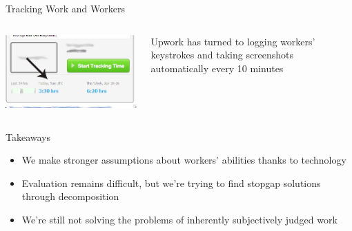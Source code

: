 \documentclass[presentation]{subfiles}
\begin{document}
\begin{frame}{Tracking Work and Workers} %
\begin{columns}
\begin{column}{.5\textwidth}
\includegraphics[max width=\textwidth,max height=.8\textheight,keepaspectratio]{figures/screenshot_odeskteamapp.jpg}
\end{column}
\begin{column}{.5\textwidth}
  Upwork has turned to logging workers' keystrokes and taking screenshots automatically every 10 minutes
\end{column}
\end{columns}

\end{frame}

\begin{frame}{Takeaways}
  \begin{itemize}
    \item We make stronger assumptions about workers' abilities thanks to technology
    \item Evaluation remains difficult, but we're trying to find stopgap solutions through decomposition
    \item We're still not solving the problems of inherently subjectively judged work
  \end{itemize}
\end{frame}

\end{document}

